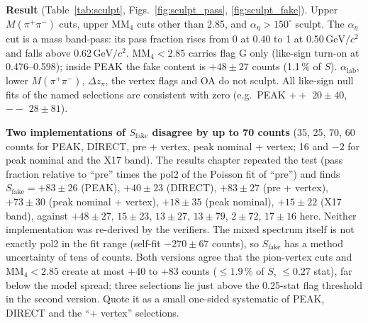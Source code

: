 \documentclass[11pt,a4paper]{article}
\newcommand{\Mpipi}{\ensuremath{M(\pi^{+}\pi^{-})}\xspace}
\newcommand{\GeVcc}{\ensuremath{\mathrm{GeV}/c^{2}}\xspace}
\newcommand{\MMfour}{\ensuremath{\mathrm{MM}_4}\xspace}
\newcommand{\dzpi}{\ensuremath{\Delta z_\pi}\xspace}
\newcommand{\alab}{\ensuremath{\alpha_{\mathrm{lab}}}\xspace}
\newcommand{\aeta}{\ensuremath{\alpha_\eta}\xspace}
\newcommand{\tipbox}[1]{\par\noindent\colorbox{blue!6}{\parbox{\dimexpr\linewidth-2\fboxsep\relax}{#1}}\par}
\begin{document}
\textbf{Result} (Table~\ref{tab:sculpt}, Figs.~\ref{fig:sculpt_pass}, \ref{fig:sculpt_fake}). Upper \Mpipi cuts, upper
\MMfour cuts other than 2.85, and $\aeta>150^\circ$ sculpt. The $\aeta$ cut is a mass band-pass: its pass fraction rises from
0 at 0.40 to 1 at 0.50\,\GeVcc and falls above 0.62\,\GeVcc. $\MMfour<2.85$ carries flag G only (like-sign turn-on at
0.476--0.598); inside PEAK the fake content is $+48\pm27$ counts (1.1\,\% of $S$). \alab, lower \Mpipi, \dzpi, the vertex flags and
OA do not sculpt. All like-sign null fits of the named selections are consistent with zero (e.g.\ PEAK $++$ $20\pm40$,
$--$ $28\pm81$).

\tipbox{\textbf{Two implementations of $S_{\mathrm{fake}}$ disagree by up to 70 counts} (35, 25, 70, 60 counts for PEAK, DIRECT,
pre + vertex, peak nominal + vertex; 16 and $-2$ for peak nominal and the X17 band). The results chapter repeated the test
(pass fraction relative to ``pre'' times the pol2 of the Poisson fit of ``pre'') and finds $S_{\mathrm{fake}}=+83\pm26$
(PEAK), $+40\pm23$ (DIRECT), $+83\pm27$ (pre + vertex), $+73\pm30$ (peak nominal + vertex), $+18\pm35$ (peak nominal),
$+15\pm22$ (X17 band), against $+48\pm27$, $15\pm23$, $13\pm27$, $13\pm79$, $2\pm72$, $17\pm16$ here. Neither
implementation was re-derived by the verifiers. The mixed spectrum itself is not exactly pol2 in the fit range
(self-fit $-270\pm67$ counts), so $S_{\mathrm{fake}}$ has a method uncertainty of tens of counts. Both versions agree that
the pion-vertex cuts and $\MMfour<2.85$ create at most $+40$ to $+83$ counts ($\le1.9$\,\% of $S$, $\le0.27$ stat), far below
the model spread; three selections lie just above the 0.25-stat flag threshold in the second version. Quote it as a
small one-sided systematic of PEAK, DIRECT and the ``+ vertex'' selections.}
\end{document}

